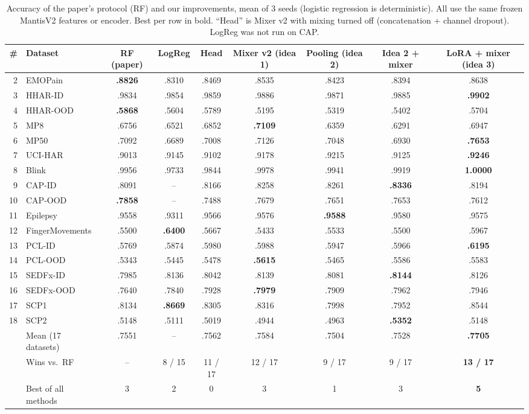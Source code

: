 \documentclass[conference]{IEEEtran}
\begin{document}
\begin{table}[t]
\caption{Accuracy of the paper's protocol (RF) and our improvements, mean of 3 seeds (logistic regression is
deterministic). All use the same frozen MantisV2 features or encoder. Best per row in bold. ``Head'' is Mixer v2 with
mixing turned off (concatenation + channel dropout). LogReg was not run on CAP.}
\label{tab:improve}
\centering
\footnotesize
\begin{tabular}{rlccccccc}
\toprule
\# & Dataset & RF (paper) & LogReg & Head & Mixer v2 (idea 1) & Pooling (idea 2) & Idea 2 + mixer & LoRA + mixer (idea 3) \\
\midrule
2 & EMOPain & \textbf{.8826} & .8310 & .8469 & .8535 & .8423 & .8394 & .8638 \\
3 & HHAR-ID & .9834 & .9854 & .9859 & .9886 & .9871 & .9885 & \textbf{.9902} \\
4 & HHAR-OOD & \textbf{.5868} & .5604 & .5789 & .5195 & .5319 & .5402 & .5704 \\
5 & MP8 & .6756 & .6521 & .6852 & \textbf{.7109} & .6359 & .6291 & .6947 \\
6 & MP50 & .7092 & .6689 & .7008 & .7126 & .7048 & .6930 & \textbf{.7653} \\
7 & UCI-HAR & .9013 & .9145 & .9102 & .9178 & .9215 & .9125 & \textbf{.9246} \\
8 & Blink & .9956 & .9733 & .9844 & .9978 & .9941 & .9919 & \textbf{1.0000} \\
9 & CAP-ID & .8091 & -- & .8166 & .8258 & .8261 & \textbf{.8336} & .8194 \\
10 & CAP-OOD & \textbf{.7858} & -- & .7488 & .7679 & .7651 & .7653 & .7612 \\
11 & Epilepsy & .9558 & .9311 & .9566 & .9576 & \textbf{.9588} & .9580 & .9575 \\
12 & FingerMovements & .5500 & \textbf{.6400} & .5667 & .5433 & .5533 & .5500 & .5967 \\
13 & PCL-ID & .5769 & .5874 & .5980 & .5988 & .5947 & .5966 & \textbf{.6195} \\
14 & PCL-OOD & .5343 & .5445 & .5478 & \textbf{.5615} & .5465 & .5586 & .5583 \\
15 & SEDFx-ID & .7985 & .8136 & .8042 & .8139 & .8081 & \textbf{.8144} & .8126 \\
16 & SEDFx-OOD & .7640 & .7840 & .7928 & \textbf{.7979} & .7909 & .7962 & .7946 \\
17 & SCP1 & .8134 & \textbf{.8669} & .8305 & .8316 & .7998 & .7952 & .8544 \\
18 & SCP2 & .5148 & .5111 & .5019 & .4944 & .4963 & \textbf{.5352} & .5148 \\
\midrule
 & Mean (17 datasets) & .7551 & -- & .7562 & .7584 & .7504 & .7528 & \textbf{.7705} \\
 & Wins vs.\ RF & -- & 8 / 15 & 11 / 17 & 12 / 17 & 9 / 17 & 9 / 17 & \textbf{13 / 17} \\
 & Best of all methods & 3 & 2 & 0 & 3 & 1 & 3 & \textbf{5} \\
\bottomrule
\end{tabular}
\end{table}
\end{document}
